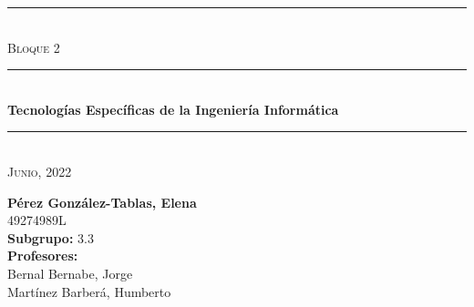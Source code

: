 \begin{titlepage}
	\begin{center}
		\rule{15cm}{0pt} \\
		[3cm]
		\textsc{\Large Bloque 2} \\
		\rule{15cm}{1pt} \\
		[0.25cm]
		\huge{\bfseries Tecnologías Específicas de la Ingeniería Informática} \\
		\rule{15cm}{1pt} \\
		[0.25cm]
		\textsc{\Large Junio, 2022}\\
		[9cm]
	\end{center}
	\begin{flushright}
		\textbf{Pérez González-Tablas, Elena} \\
		[0.25cm]
		49274989L \\
		[0.25cm]
		\textbf{Subgrupo:} 3.3 \\
		[0.25cm]
		\textbf{Profesores:} \\
		Bernal Bernabe, Jorge \\
		Martínez Barberá, Humberto \\
	\end{flushright}
\end{titlepage}
\newpage